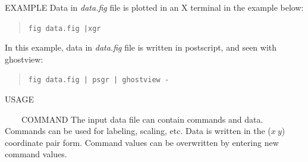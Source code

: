 \begin{options}
\end{options}

\begin{qsection}{EXAMPLE}
Data in {\em data.fig} file is plotted in an X terminal in the
example below:
\vspace{-3mm}
\begin{quote}
 \verb!fig data.fig |xgr!
\end{quote}
\vspace{-3mm}
In this example, data in {\em data.fig} file is written in postscript,
and seen with ghostview:
\vspace{-3mm}
\begin{quote}
 \verb!fig data.fig | psgr | ghostview -!
\end{quote}
\vspace{-3mm}
\end{qsection}

\vspace{-1cm}
\begin{qsection}{USAGE}
~\vspace{-1cm}
\end{qsection}

\begin{qsection}{\ ~~~COMMAND}
The input data file can contain commands and data.
Commands can be used for labeling, scaling, etc.
Data is written in the ($x ~y$) coordinate pair form.
Command values can be overwritten by entering new command values.
\end{qsection}


